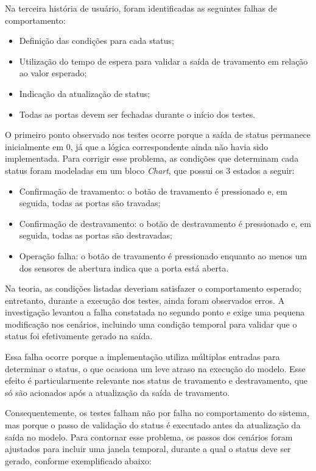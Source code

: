 Na terceira história de usuário, foram identificadas as seguintes falhas de comportamento:

\begin{itemize}
	\item Definição das condições para cada status;
	\item Utilização do tempo de espera para validar a saída de travamento em relação ao valor esperado;
	\item Indicação da atualização de status;
	\item Todas as portas devem ser fechadas durante o início dos testes.
\end{itemize}

O primeiro ponto observado nos testes ocorre porque a saída de status permanece inicialmente em 0, já que a lógica correspondente ainda não havia sido implementada. 
Para corrigir esse problema, as condições que determinam cada status foram modeladas em um bloco \textit{Chart}, que possui os 3 estados a seguir:

\begin{itemize}
	\item Confirmação de travamento: o botão de travamento é pressionado e, em seguida, todas as portas são travadas;
	\item Confirmação de destravamento: o botão de destravamento é pressionado e, em seguida, todas as portas são destravadas;
	\item Operação falha: o botão de travamento é pressionado enquanto ao menos um dos sensores de abertura indica que a porta está aberta.
\end{itemize}

Na teoria, as condições listadas deveriam satisfazer o comportamento esperado; entretanto, durante a execução dos testes, ainda foram observados erros. A investigação 
levantou a falha constatada no segundo ponto e exige uma pequena modificação nos cenários, incluindo uma condição temporal para validar que o status foi efetivamente 
gerado na saída.

Essa falha ocorre porque a implementação utiliza múltiplas entradas para determinar o status, o que ocasiona um leve atraso na execução do modelo. Esse efeito é 
particularmente relevante nos status de travamento e destravamento, que só são acionados após a atualização da saída de travamento.

Consequentemente, os testes falham não por falha no comportamento do sistema, mas porque o passo de validação do status é executado antes da atualização da saída no 
modelo. Para contornar esse problema, os passos dos cenários foram ajustados para incluir uma janela temporal, durante a qual o status deve ser gerado, conforme 
exemplificado abaixo:

